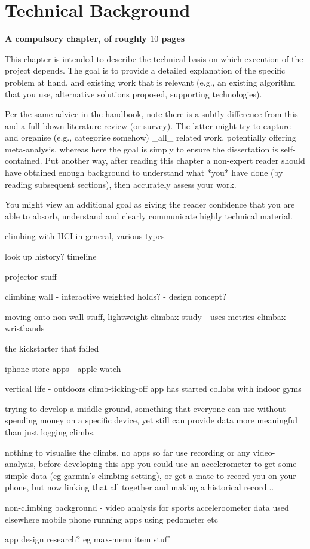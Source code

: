 \chapter{Technical Background}
\label{chap:technical}

{\bf A compulsory chapter,     of roughly $10$ pages}
\vspace{1cm}

\noindent
This chapter is intended to describe the technical basis on which execution
of the project depends.  The goal is to provide a detailed explanation of
the specific problem at hand, and existing work that is relevant (e.g., an
existing algorithm that you use, alternative solutions proposed, supporting
technologies).

Per the same advice in the handbook, note there is a subtly difference from
this and a full-blown literature review (or survey).  The latter might try
to capture and organise (e.g., categorise somehow) _all_ related work,
potentially offering meta-analysis, whereas here the goal is simply to
ensure the dissertation is self-contained.  Put another way, after reading
this chapter a non-expert reader should have obtained enough background to
understand what *you* have done (by reading subsequent sections), then
accurately assess your work.

You might view an additional goal as giving the reader confidence that you are able to absorb, understand and clearly
communicate highly technical material.



climbing with HCI in general, various types

look up history? timeline

projector stuff

climbing wall - interactive weighted holds? - design concept?


moving onto non-wall stuff, lightweight
climbax study - uses metrics
climbax wristbands

the kickstarter that failed

iphone store apps - apple watch

vertical life - outdoors climb-ticking-off app has started collabs with indoor gyms



trying to develop a middle ground, something that everyone can use without spending money on a specific device, yet still can provide data more meaningful than just logging climbs.

nothing to visualise the climbs, no apps so far use recording or any video-analysis, before developing this app you could use an accelerometer to get some simple data (eg garmin's climbing setting), or get a mate to record you on your phone, but now linking that all together and making a historical record...






non-climbing background
- video analysis for sports
acceleroometer data used elsewhere
mobile phone running apps using pedometer etc



app design research?
eg max-menu item stuff
